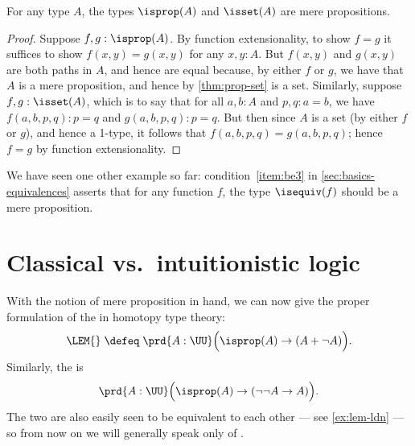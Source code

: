 \begin{lem}\label{thm:isprop-isprop}\label{thm:isprop-isset}
  For any type $A$, the types $\isprop(A)$ and $\isset(A)$ are mere propositions.
\end{lem}
\begin{proof}
  Suppose $f,g:\isprop(A)$.  By function extensionality, to show $f=g$ it
  suffices to show $f(x,y)=g(x,y)$ for any $x,y:A$.  But $f(x,y)$ and $g(x,y)$
  are both paths in $A$, and hence are equal because, by either $f$ or $g$, we
  have that $A$ is a mere proposition, and hence by \cref{thm:prop-set} is a
  set.  Similarly, suppose $f,g:\isset(A)$, which is to say that for all
  $a,b:A$ and $p,q:a=b$, we have $f(a,b,p,q):p=q$ and $g(a,b,p,q):p=q$.  But then since $A$ is a set (by
  either $f$ or $g$), and hence a 1-type, it follows that $f(a,b,p,q)=g(a,b,p,q)$; hence $f=g$ by
  function extensionality.
\end{proof}

We have seen one other example so far: condition~\ref{item:be3} in \cref{sec:basics-equivalences} asserts that for any function $f$, the type $\isequiv (f)$ should be a mere proposition.

%
%

\section{Classical vs.\ intuitionistic logic}
\label{sec:intuitionism}

%
%
With the notion of mere proposition in hand, we can now give the proper formulation of the 
%
%
%
in homotopy type theory:
\begin{equation}
  \label{eq:lem}
  \LEM{}\;\defeq\;
  \prd{A:\UU} \Big(\isprop(A) \to (A + \neg A)\Big).
\end{equation}
Similarly, the 
%
%
%
is
\begin{equation}
  \label{eq:ldn}
  \prd{A:\UU} \Big(\isprop(A) \to (\neg\neg A \to A)\Big).
\end{equation}
The two are also easily seen to be equivalent to each other --- see \cref{ex:lem-ldn} --- so from now on we will generally speak only of \LEM{}.

